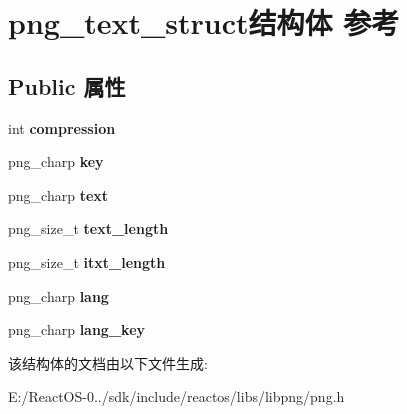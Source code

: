 \hypertarget{structpng__text__struct}{}\section{png\+\_\+text\+\_\+struct结构体 参考}
\label{structpng__text__struct}
\subsection*{Public 属性}
\begin{DoxyCompactItemize}
\item 
\mbox{\label{structpng__text__struct_ad09c73bc91f014ad352abfbb3b61b8d1}} 
int {\bfseries compression}
\item 
\mbox{\label{structpng__text__struct_a99c3063a15889d2fc242f24b69c567ef}} 
png\+\_\+charp {\bfseries key}
\item 
\mbox{\label{structpng__text__struct_a27492227bc525bee14abcc8002084edd}} 
png\+\_\+charp {\bfseries text}
\item 
\mbox{\label{structpng__text__struct_a26312284ecc7a95e2168a29d0170b411}} 
png\+\_\+size\+\_\+t {\bfseries text\+\_\+length}
\item 
\mbox{\label{structpng__text__struct_aca3fd6fec58f54460d57ad07182d570d}} 
png\+\_\+size\+\_\+t {\bfseries itxt\+\_\+length}
\item 
\mbox{\label{structpng__text__struct_a803048cbecc84ca530d64db6513f4fc6}} 
png\+\_\+charp {\bfseries lang}
\item 
\mbox{\label{structpng__text__struct_a61ee3cba011cf3bdefda49f8f9885482}} 
png\+\_\+charp {\bfseries lang\+\_\+key}
\end{DoxyCompactItemize}


该结构体的文档由以下文件生成\+:\begin{DoxyCompactItemize}
\item 
E\+:/\+React\+O\+S-\/0../sdk/include/reactos/libs/libpng/png.\+h\end{DoxyCompactItemize}
